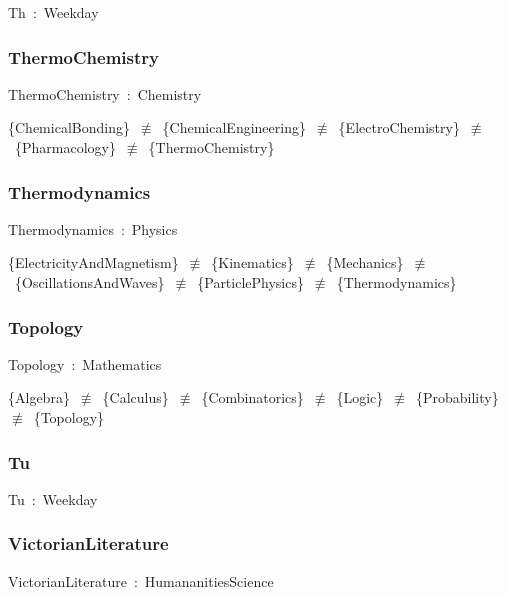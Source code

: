 \documentclass{article}
\begin{document}
Th~:~Weekday

\subsubsection*{ThermoChemistry}

ThermoChemistry~:~Chemistry

\{ChemicalBonding\}~\ensuremath{\not\equiv}~\{ChemicalEngineering\}~\ensuremath{\not\equiv}~\{ElectroChemistry\}~\ensuremath{\not\equiv}~\{Pharmacology\}~\ensuremath{\not\equiv}~\{ThermoChemistry\}

\subsubsection*{Thermodynamics}

Thermodynamics~:~Physics

\{ElectricityAndMagnetism\}~\ensuremath{\not\equiv}~\{Kinematics\}~\ensuremath{\not\equiv}~\{Mechanics\}~\ensuremath{\not\equiv}~\{OscillationsAndWaves\}~\ensuremath{\not\equiv}~\{ParticlePhysics\}~\ensuremath{\not\equiv}~\{Thermodynamics\}

\subsubsection*{Topology}

Topology~:~Mathematics

\{Algebra\}~\ensuremath{\not\equiv}~\{Calculus\}~\ensuremath{\not\equiv}~\{Combinatorics\}~\ensuremath{\not\equiv}~\{Logic\}~\ensuremath{\not\equiv}~\{Probability\}~\ensuremath{\not\equiv}~\{Topology\}

\subsubsection*{Tu}

Tu~:~Weekday

\subsubsection*{VictorianLiterature}

VictorianLiterature~:~HumananitiesScience
\end{document}
